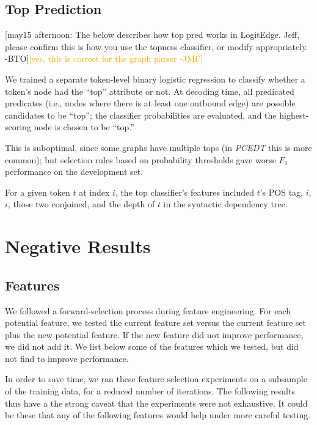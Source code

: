 \documentclass[11pt]{article}
\newcommand{\bocomment}[1]{\textcolor{Bittersweet}{[#1 -BTO]}}
\newcommand{\jmf}[1]{\textcolor{orange}{[#1 -JMF]}}
\newcommand{\codenote}[1]{}
\begin{document}
\subsection{Top Prediction} \label{s:top_model}

\bocomment{may15 afternoon: The below describes how top pred works in LogitEdge.  Jeff, please confirm this is how you use the topness classifier, or modify appropriately.}\jmf{yes, this is correct for the graph parser}

We trained a separate token-level binary logistic regression to classify
whether a token's node had the ``top'' attribute or not.
At decoding time, all predicated predicates (i.e., nodes where there is at least one outbound edge)
are possible candidates to be ``top'';
the classifier probabilities are evaluated, and the highest-scoring node is
chosen to be ``top.''
\codenote{LogitEdge: MyGraph::decideTops()}
This is suboptimal, since some graphs have multiple tops (in \emph{PCEDT} this is
more common);
but selection rules based on probability thresholds gave worse $F_1$
performance on the development set. \codenote{\url{https://github.com/Noahs-ARK/semeval-2014/issues/37}}

For a given token $t$ at index $i$, the top classifier's features
included $t$'s POS tag, $i$, $i$, those two conjoined, and the depth
of $t$ in the syntactic dependency tree.


\section{Negative Results}

\subsection{Features}
\label{s:badfeatures}

We followed a forward-selection process during feature engineering.
For each potential feature, we tested the current feature set versus the current
feature set plus the new potential feature.
If the new feature did not improve performance, we did not add it.
We list below some of the features which we tested, but did not find to improve
performance.

In order to save time, we ran these feature selection experiments
on a subsample of the training data, for a reduced number of iterations.
The following results thus have a 
the strong caveat that the experiments were
not exhaustive.  It could be these that any of the following features would help under more careful testing.
\end{document}
